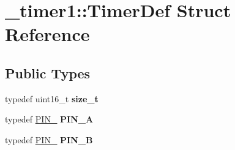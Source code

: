 \hypertarget{struct__timer1_1_1TimerDef}{}\section{\+\_\+timer1\+:\+:Timer\+Def Struct Reference}
\label{struct__timer1_1_1TimerDef}
\subsection*{Public Types}
\begin{DoxyCompactItemize}
\item 
typedef uint16\+\_\+t {\bfseries size\+\_\+t}\hypertarget{struct__timer1_1_1TimerDef_ab1eff69c17b23ae20403b94c8a286e27}{}\label{struct__timer1_1_1TimerDef_ab1eff69c17b23ae20403b94c8a286e27}

\item 
typedef \hyperlink{structports_1_1Pin}{P\+I\+N\+\_} {\bfseries P\+I\+N\+\_\+A}\hypertarget{struct__timer1_1_1TimerDef_a6b8de889a9e10b6889f751db480fb92e}{}\label{struct__timer1_1_1TimerDef_a6b8de889a9e10b6889f751db480fb92e}

\item 
typedef \hyperlink{structports_1_1Pin}{P\+I\+N\+\_} {\bfseries P\+I\+N\+\_\+B}\hypertarget{struct__timer1_1_1TimerDef_adb1333d11a42c46fe8aeb8e9a85dad7f}{}\label{struct__timer1_1_1TimerDef_adb1333d11a42c46fe8aeb8e9a85dad7f}

\end{DoxyCompactItemize}
